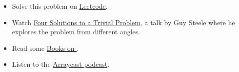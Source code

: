 \documentclass{article}
\begin{document}
\begin{itemize}
  \item Solve this problem on \href{https://leetcode.com/problems/trapping-rain-water/}{Leetcode}.
  \item Watch \href{https://youtu.be/ftcIcn8AmSY}{Four Solutions to a Trivial Problem}, a talk by Guy Steele where he explores the problem from different angles.
  \item Read some \href{https://code.jsoftware.com/wiki/Books}{Books on }.
  \item Listen to the \href{https://arraycast.com/}{Arraycast podcast}.
\end{itemize}
\end{document}
